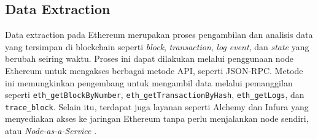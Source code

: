 \subsection{Data Extraction}
\label{subsec:data-extraction}

Data extraction pada Ethereum merupakan proses pengambilan dan analisis data yang tersimpan di blockchain seperti \textit{block}, \textit{transaction}, \textit{log event}, dan \textit{state} yang berubah seiring waktu. Proses ini dapat dilakukan melalui penggunaan node Ethereum untuk mengakses berbagai metode API, seperti JSON-RPC. Metode ini memungkinkan pengembang untuk mengambil data melalui pemanggilan seperti \texttt{eth\_getBlockByNumber}, \texttt{eth\_getTransactionByHash}, \texttt{eth\_getLogs}, dan \texttt{trace\_block}. Selain itu, terdapat juga layanan seperti Alchemy dan Infura yang menyediakan akses ke jaringan Ethereum tanpa perlu menjalankan node sendiri, atau \textit{Node-as-a-Service} \parencite{ethereum_jsonrpc}.